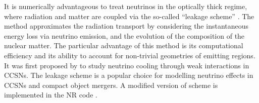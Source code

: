 It is numerically advantageous to treat neutrinos in the optically thick regime, 
where radiation and matter are coupled via 
the so-called ``leakage scheme''
%
\citep{Ruffert:1995fs,Rosswog:2003rv,Sekiguchi:2010zz,OConnor:2009iuz,Galeazzi:2013mia}. 
%
%
The method approximates the radiation transport by considering 
the instantaneous energy loss via neutrino emission, and the evolution of the 
composition of the nuclear matter.
The particular advantage of this method is its computational efficiency and 
its ability to account for non-trivial geometries of emitting regions.
%
It was first proposed by \citet{vanRiper:1981mko} to study neutrino cooling through 
weak interactions in \acp{CCSN}. The leakage scheme is a popular choice for modelling neutrino 
effects in \acp{CCSN} and compact object mergers.
%
A modified version of \citet{Galeazzi:2013mia} scheme is implemented in the 
\ac{NR} code \wisky{} \citep{Radice:2016dwd,Radice:2018pdn}.




